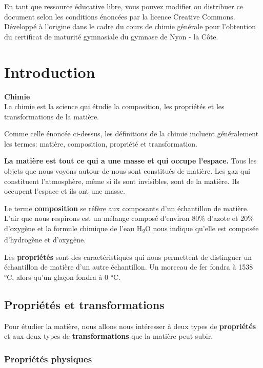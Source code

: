 \documentclass[
  11pt,
  a4paper,
  openany]{book}
\begin{document}
En tant que ressource éducative libre, vous pouvez modifier ou distribuer ce document selon les conditions énoncées par la licence Creative Commons. Développé à l'origine dans le cadre du cours de chimie générale pour l'obtention du certificat de maturité gymnasiale du gymnase de Nyon - la Côte.

\hypertarget{introduction}{%
\chapter{Introduction}\label{introduction}}

\begin{tcolorbox}
\textbf{Chimie}\\
La chimie est la science qui étudie la composition, les propriétés et les transformations de la matière.

\end{tcolorbox}

Comme celle énoncée ci-dessus, les définitions de la chimie incluent généralement les termes: matière, composition, propriété et transformation.

\textbf{La matière est tout ce qui a une masse et qui occupe l'espace.} Tous les objets que nous voyons autour de nous sont constitués de matière. Les gaz qui constituent l'atmosphère, même si ils sont invisibles, sont de la matière. Ils occupent l'espace et ils ont une masse.

Le terme \textbf{composition} se réfère aux composants d'un échantillon de matière. L'air que nous respirons est un mélange composé d'environ 80\% d'azote et 20\% d'oxygène et la formule chimique de l'eau H\textsubscript{2}O nous indique qu'elle est composée d'hydrogène et d'oxygène.

Les \textbf{propriétés} sont des caractéristiques qui nous permettent de distinguer un échantillon de matière d'un autre échantillon. Un morceau de fer fondra à 1538 °C, alors qu'un glaçon fondra à 0 °C.

\hypertarget{propriuxe9tuxe9s-et-transformations}{%
\section{Propriétés et transformations}\label{propriuxe9tuxe9s-et-transformations}}

Pour étudier la matière, nous allons nous intéresser à deux types de \textbf{propriétés} et aux deux types de \textbf{transformations} que la matière peut subir.

\hypertarget{propriuxe9tuxe9s-physiques}{%
\subsection{Propriétés physiques}\label{propriuxe9tuxe9s-physiques}}
\end{document}
